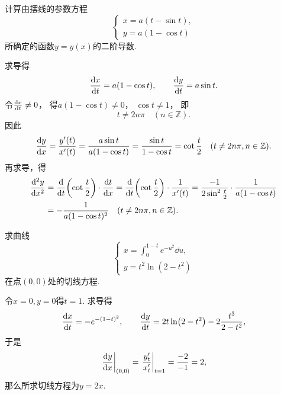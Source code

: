 \begin{example}
计算由摆线的参数方程\begin{equation*}
	\left\{ \begin{array}{l}
		x=a(t-\sin t), \\
		y=a(1-\cos t)
	\end{array} \right.
\end{equation*}所确定的函数\(y=y(x)\)的二阶导数.
\begin{solution}
求导得\begin{equation*}
	\dv{x}{t}=a(1-\cos t), \qquad
	\dv{y}{t}=a\sin t.
\end{equation*}
令\(\dv{x}{t}\neq0\)，
得\(a(1-\cos t)\neq0\)，
\(\cos t\neq1\)，
即\begin{equation*}
	t\neq 2n\pi
	\quad(n\in\mathbb{Z}).
\end{equation*}
因此\begin{equation*}
	\dv{y}{x}
	=\frac{y'(t)}{x'(t)}
	=\frac{a\sin t}{a(1-\cos t)}
	=\frac{\sin t}{1-\cos t}
	=\cot\frac{t}{2}
	\quad(t\neq 2n\pi,n\in\mathbb{Z}).
\end{equation*}
再求导，得\begin{align*}
	\dv[2]{y}{x}
	&=\dv{t}(\cot\frac{t}{2}) \cdot \dv{t}{x}
	=\dv{t}(\cot\frac{t}{2}) \cdot \frac{1}{x'(t)}
	=\frac{-1}{2\sin^2\frac{t}{2}}
	\cdot\frac{1}{a(1-\cos t)} \\
	&=-\frac{1}{a(1-\cos t)^2}
	\quad(t\neq 2n\pi,n\in\mathbb{Z}).
\end{align*}
\end{solution}
\end{example}

\begin{example}
求曲线\begin{equation*}
	\left\{ \begin{array}{l}
		x = \int_0^{1-t} e^{-u^2} \dd{u}, \\
		y = t^2 \ln(2-t^2)
	\end{array} \right.
\end{equation*}在点\((0,0)\)处的切线方程.
\begin{solution}
令\(x = 0, y = 0\)得\(t = 1\).
求导得\begin{equation*}
	\dv{x}{t}
	= -e^{-(1-t)^2},
	\qquad
	\dv{y}{t}
	= 2t \ln(2-t^2) - 2\frac{t^3}{2-t^2},
\end{equation*}
于是\begin{equation*}
	\eval{\dv{y}{x}}_{(0,0)}
	= \eval{\frac{y'_t}{x'_t}}_{t=1}
	= \frac{-2}{-1}
	= 2,
\end{equation*}
那么所求切线方程为\(y = 2 x\).
\end{solution}
\end{example}

